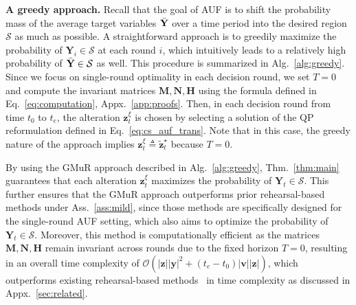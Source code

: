 \documentclass{article}
\theoremstyle{plain}
\theoremstyle{definition}
\theoremstyle{remark}
\def \Eq {Eq.}
\def \thm {Thm.}
\def \N {\mathbf{N}}
\def \sS {\mathcal{S}}
\def \Y {\mathbf{Y}}
\def \M {\mathbf{M}}
\def \H {\mathbf{H}}
\def \v {\mathbf{v}}
\def \y {\mathbf{y}}
\def \z {\mathbf{z}}
\begin{document}
\textbf{A greedy approach.} 
Recall that the goal of AUF is to shift the probability mass of the average target variables \(\Bar{\Y}\) over a time period into the desired region \(\sS\) as much as possible. 
A straightforward approach is to greedily maximize the probability of \(\Y_i \in \sS\) at each round \(i\), which intuitively leads to a relatively high probability of \(\Bar{\Y} \in \sS\) as well. 
This procedure is summarized in Alg.~\ref{alg:greedy}. Since we focus on single-round optimality in each decision round, we set \(T = 0\) and compute the invariant matrices \(\M, \N, \H\) using the formula defined in \Eq~\eqref{eq:computation}, Appx.~\ref{app:proofs}. 
Then, in each decision round from time \(t_0\) to \(t_e\), the alteration \(\z_t^\xi\) is chosen by selecting a solution of the QP reformulation defined in \Eq~\eqref{eq:cs_auf_trans}. 
Note that in this case, the greedy nature of the approach implies \(\z_t^\xi\triangleq \tilde{\z}_t^\star \) because \(T=0\).

By using the GMuR approach described in Alg.~\ref{alg:greedy}, \thm~\ref{thm:main} guarantees that each alteration \(\z_t^\xi\) maximizes the probability of \(\Y_t \in \sS\). 
This further ensures that the GMuR approach outperforms prior rehearsal-based methods under Ass.~\ref{ass:mild}, since those methods are specifically designed for the single-round AUF setting, which also aims to optimize the probability of \(\Y_t \in \sS\). 
Moreover, this method is computationally efficient as the matrices \(\M, \N, \H\) remain invariant across rounds due to the fixed horizon \(T=0\), 
resulting in an overall time complexity of \(\mathcal{O}(|\z||\y|^2 + (t_e - t_0) |\v||\z|)\), which outperforms existing rehearsal-based methods~\citep{qint2023srm,du2024micns} in time complexity as discussed in Appx.~\ref{sec:related}. 
\end{document}
